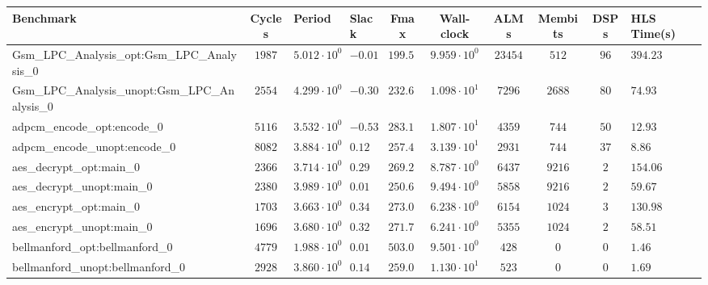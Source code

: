 \begin{tabular}{|l|c|HHc|c|c|c|cH|}
\hline
Benchmark                                       & Cycles       & Period                 & Slack     & Fmax       & Wall-clock              & ALMs       & Membits     & DSPs    & HLS Time(s) \\
\hline
Gsm\_LPC\_Analysis\_opt:Gsm\_LPC\_Analysis\_0   & $ 1987     $ & $ 5.012 \cdot 10^{0} $ & $ -0.01 $ & $ 199.52 $ & $ 9.959 \cdot 10^{0}  $ & $ 23454  $ & $ 512     $ & $ 96  $ & $ 394.23  $ \\
Gsm\_LPC\_Analysis\_unopt:Gsm\_LPC\_Analysis\_0 & $ 2554     $ & $ 4.299 \cdot 10^{0} $ & $ -0.30 $ & $ 232.61 $ & $ 1.098 \cdot 10^{1}  $ & $ 7296   $ & $ 2688    $ & $ 80  $ & $ 74.93   $ \\
adpcm\_encode\_opt:encode\_0                    & $ 5116     $ & $ 3.532 \cdot 10^{0} $ & $ -0.53 $ & $ 283.13 $ & $ 1.807 \cdot 10^{1}  $ & $ 4359   $ & $ 744     $ & $ 50  $ & $ 12.93   $ \\
adpcm\_encode\_unopt:encode\_0                  & $ 8082     $ & $ 3.884 \cdot 10^{0} $ & $ 0.12  $ & $ 257.47 $ & $ 3.139 \cdot 10^{1}  $ & $ 2931   $ & $ 744     $ & $ 37  $ & $ 8.86    $ \\
aes\_decrypt\_opt:main\_0                       & $ 2366     $ & $ 3.714 \cdot 10^{0} $ & $ 0.29  $ & $ 269.25 $ & $ 8.787 \cdot 10^{0}  $ & $ 6437   $ & $ 9216    $ & $ 2   $ & $ 154.06  $ \\
aes\_decrypt\_unopt:main\_0                     & $ 2380     $ & $ 3.989 \cdot 10^{0} $ & $ 0.01  $ & $ 250.69 $ & $ 9.494 \cdot 10^{0}  $ & $ 5858   $ & $ 9216    $ & $ 2   $ & $ 59.67   $ \\
aes\_encrypt\_opt:main\_0                       & $ 1703     $ & $ 3.663 \cdot 10^{0} $ & $ 0.34  $ & $ 273.00 $ & $ 6.238 \cdot 10^{0}  $ & $ 6154   $ & $ 1024    $ & $ 3   $ & $ 130.98  $ \\
aes\_encrypt\_unopt:main\_0                     & $ 1696     $ & $ 3.680 \cdot 10^{0} $ & $ 0.32  $ & $ 271.74 $ & $ 6.241 \cdot 10^{0}  $ & $ 5355   $ & $ 1024    $ & $ 2   $ & $ 58.51   $ \\
bellmanford\_opt:bellmanford\_0                 & $ 4779     $ & $ 1.988 \cdot 10^{0} $ & $ 0.01  $ & $ 503.02 $ & $ 9.501 \cdot 10^{0}  $ & $ 428    $ & $ 0       $ & $ 0   $ & $ 1.46    $ \\
bellmanford\_unopt:bellmanford\_0               & $ 2928     $ & $ 3.860 \cdot 10^{0} $ & $ 0.14  $ & $ 259.07 $ & $ 1.130 \cdot 10^{1}  $ & $ 523    $ & $ 0       $ & $ 0   $ & $ 1.69    $ \\

\end{tabular}
